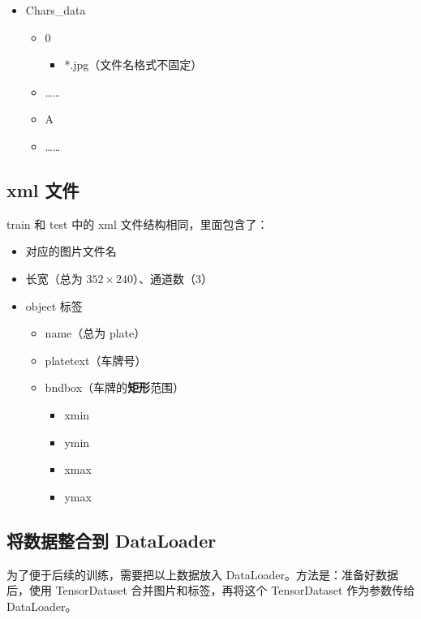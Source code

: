\documentclass[UTF8]{article}
\begin{document}
\begin{multicols}{2}
\begin{itemize}
\begin{itemize}
\begin{itemize}
			\end{itemize}
		\end{itemize}
		\item Chars\_data
		\begin{itemize}
			\item 0
			\begin{itemize}
				\item *.jpg（文件名格式不固定）
			\end{itemize}
			\item ……
			\item A
			\item ……
		\end{itemize}
	\end{itemize}
	\end{multicols}

	\subsection{xml 文件}

	train 和 test 中的 xml 文件结构相同，里面包含了\cite{homework}：
	
	\begin{multicols}{2}
	\begin{itemize}
		\item 对应的图片文件名
		\item 长宽（总为 $352 \times 240$）、通道数（3）
		\item object 标签
		\begin{itemize}
			\item name（总为 plate）
			\item platetext（车牌号）
			\item bndbox（车牌的\textbf{矩形}范围）
			\begin{itemize}
				\item xmin
				\item ymin
				\item xmax
				\item ymax
			\end{itemize}
		\end{itemize}
	\end{itemize}
	\end{multicols}
	
	\subsection{将数据整合到 DataLoader}

	为了便于后续的训练，需要把以上数据放入 DataLoader。方法是：准备好数据后，使用 TensorDataset 合并图片和标签，再将这个 TensorDataset 作为参数传给 DataLoader。\cite{dataloader}

	
\end{document}
